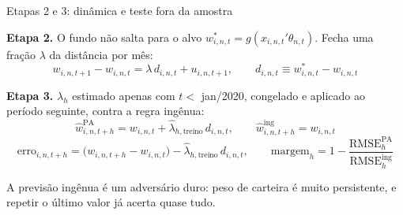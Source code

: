 \documentclass[aspectratio=169,11pt]{beamer}
\begin{document}
\begin{frame}{Etapas 2 e 3: dinâmica e teste fora da amostra}

\textbf{Etapa 2.} O fundo não salta para o alvo $w^*_{i,n,t}=g(x_{i,n,t}'\theta_{n,t})$.
Fecha uma fração $\lambda$ da distância por mês:
\begin{equation*}
w_{i,n,t+1}-w_{i,n,t} = \lambda\, d_{i,n,t} + u_{i,n,t+1},
\qquad d_{i,n,t}\equiv w^*_{i,n,t}-w_{i,n,t}
\end{equation*}

\textbf{Etapa 3.} $\lambda_h$ estimado apenas com $t<$ jan/2020, congelado e aplicado ao
período seguinte, contra a regra ingênua:
\begin{equation*}
\widehat w^{\text{PA}}_{i,n,t+h} = w_{i,n,t} + \widehat\lambda_{h,\text{treino}}\, d_{i,n,t},
\qquad
\widehat w^{\text{ing}}_{i,n,t+h} = w_{i,n,t}
\end{equation*}
\begin{equation*}
\text{erro}_{i,n,t+h} = \big(w_{i,n,t+h}-w_{i,n,t}\big)
- \widehat\lambda_{h,\text{treino}}\, d_{i,n,t},
\qquad
\text{margem}_h = 1 - \frac{\text{RMSE}^{\text{PA}}_h}{\text{RMSE}^{\text{ing}}_h}
\end{equation*}

\small
A previsão ingênua é um adversário duro: peso de carteira é muito persistente, e repetir o
último valor já acerta quase tudo.

\end{frame}
\end{document}
